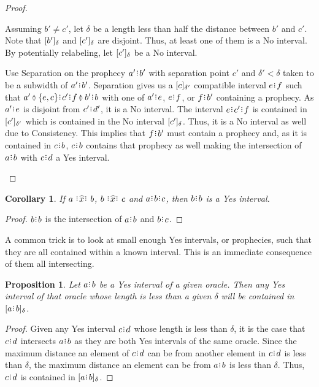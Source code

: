 \documentclass[12pt]{article}
\newtheorem{corollary}{Corollary}[section]
\newtheorem{proposition}{Proposition}[section]
\begin{document}
\begin{proof}
\begin{enumerate}
        Assuming $b' \neq c'$, let $\delta$ be a length less than half the distance between $b'$ and $c'$. Note that $\halo{b'}$ and $\halo{c'}$ are disjoint. Thus, at least one of them is a No interval. By potentially relabeling, let $\halo{c'}$ be a No interval. 

        Use Separation on the prophecy $a'\rint b'$ with separation point $c'$ and $\delta' < \delta$ taken to be a subwidth of $a'\rint b'$. Separation gives us a $\halo[\delta']{c}$ compatible interval $e\rint f$ such that $a'\betneq \{e,c\}\rint c'\rint f \betneq b'\rint b$  with one of $a'\rint e$, $e\rint f$, or $f\rint b'$ containing a prophecy. As $a'\rint e$ is disjoint from $c'\rint d'$, it is a No interval. The interval $e\rint c'\rint f$ is contained in $\halo[\delta']{c'}$ which is contained in the No interval $\halo{c'}$. Thus, it is a No interval as well due to Consistency. This implies that $f\rint b'$ must contain a prophecy and, as it is contained in $c\rint b$, $c\rint b$ contains that prophecy as well making the intersection of $a\rint b$ with $c\rint d$ a Yes interval.  
     \end{enumerate}

\end{proof}

\begin{corollary}
    If $a \xora b$, $b \xora c$ and $a\rint b\rint c$, then $b\rint b$ is a Yes interval.
\end{corollary}

\begin{proof}
    $b\rint b$ is the intersection of $a\rint b$ and $b\rint c$.
\end{proof}

A common trick is to look at small enough Yes intervals, or prophecies, such that they are all contained within a known interval. This is an immediate consequence of them all intersecting. 

\begin{proposition}\label{os-yescontain}
    Let $a\rint b$ be a Yes interval of a given oracle. Then any Yes interval of that oracle whose length is less than a given $\delta$ will be contained in $\halo{a\rint b}$.
\end{proposition}

\begin{proof}
    Given any Yes interval $c\rint d$ whose length is less than $\delta$, it is the case that $c\rint d$ intersects $a\rint b$ as they are both Yes intervals of the same oracle. Since the maximum distance an element of $c\rint d$ can be from another element in $c\rint d$ is less than $\delta$, the maximum distance an element can be from $a\rint b$ is less than $\delta$. Thus, $c\rint d$ is contained in $\halo{a\rint b}$.
\end{proof}
\end{document}
